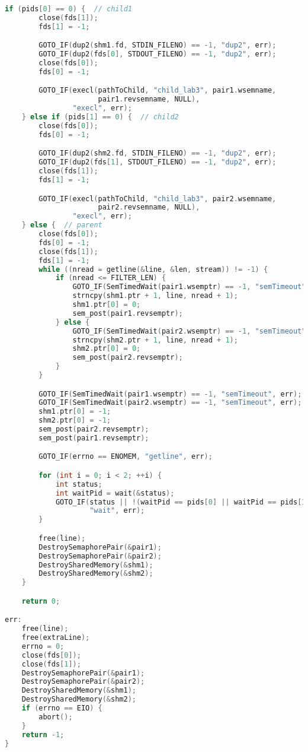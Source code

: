 \documentclass[a4paper, 12pt]{article}
\begin{document}
\begin{lstlisting}[language=C++]
    if (pids[0] == 0) {  // child1
        close(fds[1]);
        fds[1] = -1;

        GOTO_IF(dup2(shm1.fd, STDIN_FILENO) == -1, "dup2", err);
        GOTO_IF(dup2(fds[0], STDOUT_FILENO) == -1, "dup2", err);
        close(fds[0]);
        fds[0] = -1;

        GOTO_IF(execl(pathToChild, "child_lab3", pair1.wsemname,
                      pair1.revsemname, NULL),
                "execl", err);
    } else if (pids[1] == 0) {  // child2
        close(fds[0]);
        fds[0] = -1;

        GOTO_IF(dup2(shm2.fd, STDIN_FILENO) == -1, "dup2", err);
        GOTO_IF(dup2(fds[1], STDOUT_FILENO) == -1, "dup2", err);
        close(fds[1]);
        fds[1] = -1;

        GOTO_IF(execl(pathToChild, "child_lab3", pair2.wsemname,
                      pair2.revsemname, NULL),
                "execl", err);
    } else {  // parent
        close(fds[0]);
        fds[0] = -1;
        close(fds[1]);
        fds[1] = -1;
        while ((nread = getline(&line, &len, stream)) != -1) {
            if (nread <= FILTER_LEN) {
                GOTO_IF(SemTimedWait(pair1.wsemptr) == -1, "semTimeout", err);
                strncpy(shm1.ptr + 1, line, nread + 1);
                shm1.ptr[0] = 0;
                sem_post(pair1.revsemptr);
            } else {
                GOTO_IF(SemTimedWait(pair2.wsemptr) == -1, "semTimeout", err);
                strncpy(shm2.ptr + 1, line, nread + 1);
                shm2.ptr[0] = 0;
                sem_post(pair2.revsemptr);
            }
        }

        GOTO_IF(SemTimedWait(pair1.wsemptr) == -1, "semTimeout", err);
        GOTO_IF(SemTimedWait(pair2.wsemptr) == -1, "semTimeout", err);
        shm1.ptr[0] = -1;
        shm2.ptr[0] = -1;
        sem_post(pair2.revsemptr);
        sem_post(pair1.revsemptr);

        GOTO_IF(errno == ENOMEM, "getline", err);

        for (int i = 0; i < 2; ++i) {
            int status;
            int waitPid = wait(&status);
            GOTO_IF(status || !(waitPid == pids[0] || waitPid == pids[1]),
                    "wait", err);
        }

        free(line);
        DestroySemaphorePair(&pair1);
        DestroySemaphorePair(&pair2);
        DestroySharedMemory(&shm1);
        DestroySharedMemory(&shm2);
    }

    return 0;

err:
    free(line);
    free(extraLine);
    errno = 0;
    close(fds[0]);
    close(fds[1]);
    DestroySemaphorePair(&pair1);
    DestroySemaphorePair(&pair2);
    DestroySharedMemory(&shm1);
    DestroySharedMemory(&shm2);
    if (errno == EIO) {
        abort();
    }
    return -1;
}
\end{lstlisting}
\end{document}
